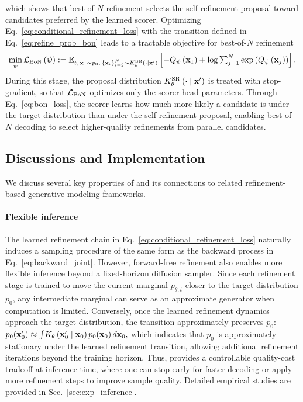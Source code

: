 which shows that best-of-$N$ refinement selects the self-refinement proposal toward candidates preferred by the learned scorer. 
Optimizing Eq.~\eqref{eq:conditional_refinement_loss} with the transition defined in Eq.~\eqref{eq:refine_prob_bon} leads to a tractable objective for best-of-$N$ refinement
\begin{equation}
  \min_{\psi}   \mathcal{L}_{\mathrm{BoN}}\left(\psi\right)  := 
  \mathbb{E}_{t,\,\mathbf{x}_1\sim p_0,\, \left\{\mathbf{x}_i\right\}_{i=2}^N\sim K_{\theta}^\mathrm{SR}\left(\cdot\mid \mathbf{x}'\right)}\left[\textstyle
   - Q_\psi\left(\mathbf{x}_1\right) + \log\sum_{j=1}^N\exp\left(Q_\psi\left(\mathbf{x}_j\right)\right)
  \right].
  \label{eq:bon_loss}
\end{equation}
During this stage, the proposal distribution $K_{\theta}^\mathrm{SR}\left(\cdot\mid\mathbf{x}'\right)$ is treated with stop-gradient, so that $\mathcal{L}_{\mathrm{BoN}}$ optimizes only the scorer head parameters. 
Through Eq.~\eqref{eq:bon_loss}, the scorer learns how much more likely a candidate is under the target distribution than under the self-refinement proposal, enabling best-of-$N$ decoding to select higher-quality refinements from parallel candidates.

\subsection{Discussions and Implementation}
\label{sec:discussion}
We discuss several key properties of \method and its connections to related refinement-based generative modeling frameworks.

\paragraph{Flexible inference}
The learned refinement chain in Eq.~\eqref{eq:conditional_refinement_loss} naturally induces a sampling procedure of the same form as the backward process in Eq.~\eqref{eq:backward_joint}. 
However, forward-free refinement also enables more flexible inference beyond a fixed-horizon diffusion sampler. 
Since each refinement stage is trained to move the current marginal $p_{\theta,t}$ closer to the target distribution $p_0$, any intermediate marginal can serve as an approximate generator when computation is limited. 
Conversely, once the learned refinement dynamics approach the target distribution, the transition approximately preserves $p_0$: $p_0(\mathbf{x}_0')
    \approx
    {\textstyle \int}
    K_{\theta}\left(\mathbf{x}_0'\mid \mathbf{x}_0\right)
    p_0(\mathbf{x}_0)
    \,d\mathbf{x}_0,$
which indicates that $p_0$ is approximately stationary under the learned refinement transition, allowing additional refinement iterations beyond the training horizon. 
Thus, \method provides a controllable quality-cost tradeoff at inference time, where one can stop early for faster decoding or apply more refinement steps to improve sample quality.
Detailed empirical studies are provided in Sec.~\ref{sec:exp_inference}.


